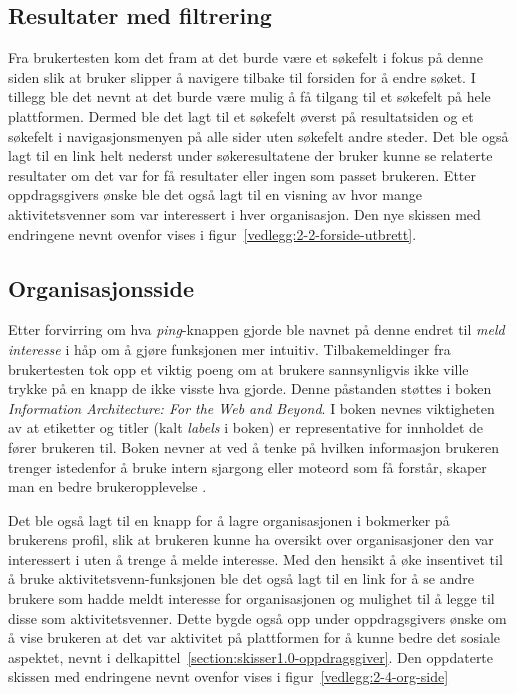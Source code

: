 \subsection{Resultater med filtrering}

Fra brukertesten kom det fram at det burde være et søkefelt i fokus på denne siden slik at bruker slipper å navigere tilbake til forsiden for å endre søket. I tillegg ble det nevnt at det burde være mulig å få tilgang til et søkefelt på hele plattformen. Dermed ble det lagt til et søkefelt øverst på resultatsiden og et søkefelt i navigasjonsmenyen på alle sider uten søkefelt andre steder. Det ble også lagt til en link helt nederst under søkeresultatene der bruker kunne se relaterte resultater om det var for få resultater eller ingen som passet brukeren. Etter oppdragsgivers ønske ble det også lagt til en visning av hvor mange aktivitetsvenner som var interessert i hver organisasjon. Den nye skissen med endringene nevnt ovenfor vises i figur~\ref{vedlegg:2-2-forside-utbrett}.

\subsection{Organisasjonsside}

Etter forvirring om hva {\em ping}-knappen gjorde ble navnet på denne endret til {\em meld interesse} i håp om å gjøre funksjonen mer intuitiv. Tilbakemeldinger fra brukertesten tok opp et viktig poeng om at brukere sannsynligvis ikke ville trykke på en knapp de ikke visste hva gjorde. Denne påstanden støttes i boken {\em Information Architecture: For the Web and Beyond}. I boken nevnes viktigheten av at etiketter og titler (kalt {\em labels} i boken) er representative for innholdet de fører brukeren til. Boken nevner at ved å tenke på hvilken informasjon brukeren trenger istedenfor å bruke intern sjargong eller moteord som få forstår, skaper man en bedre brukeropplevelse \cite{INFARC:1}.

Det ble også lagt til en knapp for å lagre organisasjonen i bokmerker på brukerens profil, slik at brukeren kunne ha oversikt over organisasjoner den var interessert i uten å trenge å melde interesse. Med den hensikt å øke insentivet til å bruke aktivitetsvenn-funksjonen ble det også lagt til en link for å se andre brukere som hadde meldt interesse for organisasjonen og mulighet til å legge til disse som aktivitetsvenner. Dette bygde også opp under oppdragsgivers ønske om å vise brukeren at det var aktivitet på plattformen for å kunne bedre det sosiale aspektet, nevnt i delkapittel~\ref{section:skisser1.0-oppdragsgiver}. Den oppdaterte skissen med endringene nevnt ovenfor vises i figur~\ref{vedlegg:2-4-org-side}

